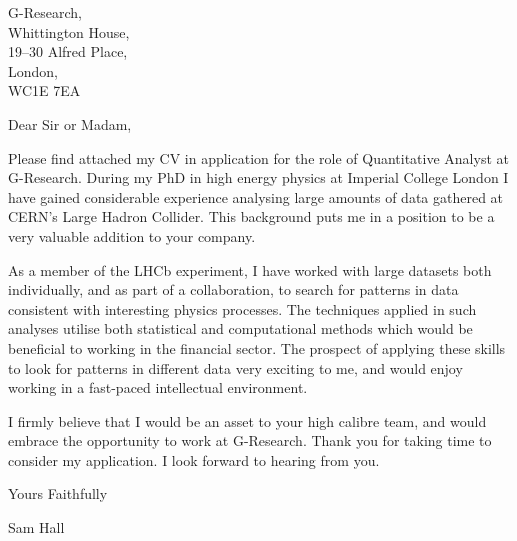 
\begin{minipage}{0.5\textwidth}
G-Research,\\
Whittington House,\\
19--30 Alfred Place,\\
London,\\
WC1E 7EA\\
\vspace{3em}
\end{minipage}


Dear Sir or Madam,

Please find attached my CV in application for the role of Quantitative Analyst at G-Research.
During my PhD in high energy physics at Imperial College London I have gained considerable
experience analysing large amounts of data gathered at CERN's Large Hadron Collider.
This background puts me in a position to be a very valuable addition to your company.


As a member of the LHCb experiment,
I have worked with large datasets both individually, and as part of a collaboration, to search for
patterns in data consistent with interesting physics processes.
The techniques applied in such analyses utilise both statistical and computational methods which
would be beneficial to working in the financial sector.
The prospect of applying these skills to look for patterns in different data very exciting to me,
and would enjoy working in a fast-paced intellectual environment.

I firmly believe that I would be an asset to your high calibre team, and would embrace the
opportunity to work at G-Research.
Thank you for taking time to consider my application.
I look forward to hearing from you.

Yours Faithfully


Sam Hall


